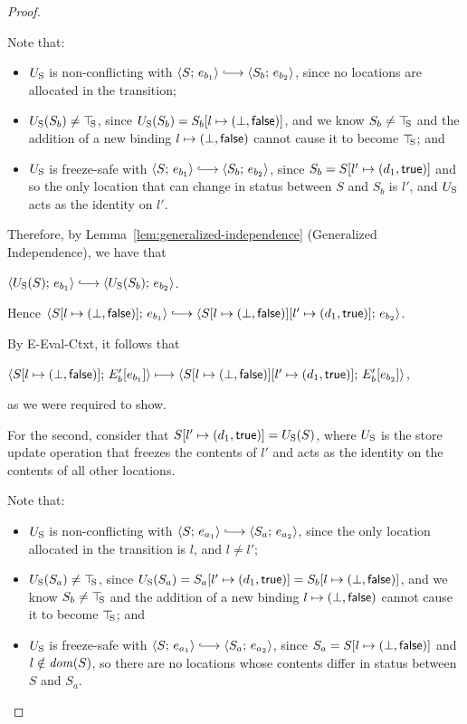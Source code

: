 \begin{proof}
\begin{enumerate}
\begin{enumerate}
      Note that:
      \begin{itemize}
      \item $U_{\mathrm{S}}$ is non-conflicting with $\config{S}{e_{b_1}}
        \parstepsto \config{S_b}{e_{b_2}}$, since no locations are
        allocated in the transition;
      \item $U_{\mathrm{S}}(S_b) \neq \top\hspace{-0.85mm}_{\mathrm{S}}$, since $U_{\mathrm{S}}(S_b) =
        S_b[l \mapsto (\bot, \textsf{false})]$, and we know $S_b \neq
        \top\hspace{-0.85mm}_{\mathrm{S}}$ and the addition of a new binding
        $l \mapsto (\bot, \textsf{false})$ cannot cause it to
        become $\top\hspace{-0.85mm}_{\mathrm{S}}$; and
      \item $U_{\mathrm{S}}$ is freeze-safe with $\config{S}{e_{b_1}}
        \parstepsto \config{S_b}{e_{b_2}}$, since $S_b =
        S[l' \mapsto (d_1, \textsf{true})]$ and so the only location
        that can change in status between $S$ and $S_b$ is $l'$, and
        $U_{\mathrm{S}}$ acts as the identity on $l'$.
      \end{itemize}
      Therefore, by Lemma~\ref{lem:generalized-independence}
      (Generalized Independence), we have that

      $\config{\Ustore(S)}{e_{b_1}} \parstepsto
      \config{\Ustore(S_b)}{e_{b_2}}$.

      Hence $\config{\extS{S}{l}{\bot}{\frozenfalse}}{e_{b_1}}
      \parstepsto
      \config{\extS{\extS{S}{l}{\bot}{\frozenfalse}}{l'}{d_1}{\frozentrue}}{e_{b_2}}$.

      By {\sc E-Eval-Ctxt}, it follows that

      $\langle S[l \mapsto (\bot, \textsf{false})];\, E'_b\hspace{-0.5mm}\left[e_{b_1}\right] \rangle
      \longmapsto
      \langle S[l \mapsto (\bot, \textsf{false})][l' \mapsto (d_1, \textsf{true})];\, E'_b\hspace{-0.5mm}\left[e_{b_2}\right] \rangle$,

      as we were required to show.

      For the second, consider that $S[l' \mapsto (d_1, \textsf{true})] =
      U_{\mathrm{S}}(S)$, where $U_{\mathrm{S}}$ is the store update operation that freezes
      the contents of $l'$ and acts as the identity on the contents of
      all other locations.

      Note that:
      \begin{itemize}
      \item $U_{\mathrm{S}}$ is non-conflicting with $\config{S}{e_{a_1}}
        \parstepsto \config{S_a}{e_{a_2}}$, since the only location
        allocated in the transition is $l$, and $l \neq l'$;
      \item $U_{\mathrm{S}}(S_a) \neq \top\hspace{-0.85mm}_{\mathrm{S}}$, since $U_{\mathrm{S}}(S_a) =
        S_a[l' \mapsto (d_1, \textsf{true})] =
        S_b[l \mapsto (\bot, \textsf{false})]$, and we know $S_b \neq
        \top\hspace{-0.85mm}_{\mathrm{S}}$ and the addition of a new binding
        $l \mapsto (\bot, \textsf{false})$ cannot cause it to
        become $\top\hspace{-0.85mm}_{\mathrm{S}}$; and
      \item $U_{\mathrm{S}}$ is freeze-safe with $\config{S}{e_{a_1}}
        \parstepsto \config{S_a}{e_{a_2}}$, since $S_a =
        S[l \mapsto (\bot, \textsf{false})]$ and $l \notin \mathit{dom}(S)$, so
        there are no locations whose contents differ in status
        between $S$ and $S_a$.
      \end{itemize}


\end{enumerate}
\end{enumerate}
\end{proof}
